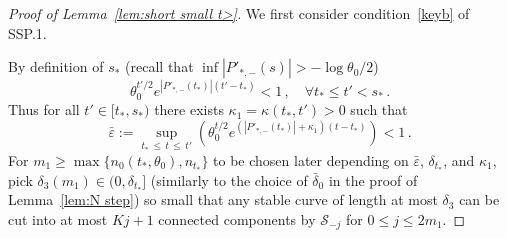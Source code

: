 \documentclass[AHL,Unicode,longabstracts,published]{cedram}
\newcommand{\cS}{\mathcal{S}}
\newcommand{\ve}{\varepsilon}
\let\oldforall\forall
\renewcommand*{\forall}{\mathrel{\oldforall}}
\begin{document}
\begin{proof}[Proof of Lemma~\ref{lem:short small t>}]
We first consider condition~\eqref{keyb} of SSP.1.

By definition of $s_*$ (recall that $\inf |P'_{*,-}(s)|>-\log \theta_0/2$)
\begin{equation}\label{choice'}
\theta_0^{t'/2} e^{\left| P'_{*,-}(t_*)\right| (t'-t_*)} < 1\,,\quad
\forall t_*\le t' < s_*\,.
\end{equation}
Thus for all $t' \in [t_*, s_*)$ there exists $ \kappa_1 = \kappa(t_*, t') >0$ such that
\begin{equation}\label{nofoot}
\bar \ve := \sup_{t_*\,\le\,t\,\le\,t'}\left(\theta_0^{t/2} e^{\left(\left| P'_{*,-}(t_*)\right| + \kappa_1\right)(t-t_*)}\right) < 1\,.
\end{equation}
For $m_1\ge \max\{n_0(t_*,\theta_0),n_{t_*}\}$ to be chosen later depending on $\bar \ve$, $\delta_{t_*}$, and $\kappa_1$, pick $\delta_3(m_1){\in (0, \delta_{t_*}]}$ (similarly to the choice of $\bar \delta_0$ in the proof of Lemma~\ref{lem:N step}) so small that any stable curve of length at most $\delta_3$ can be cut into at most $Kj+1$ connected components by $\cS_{-j}$ for $0 \le j \le 2m_1$.




\end{proof}
\end{document}

